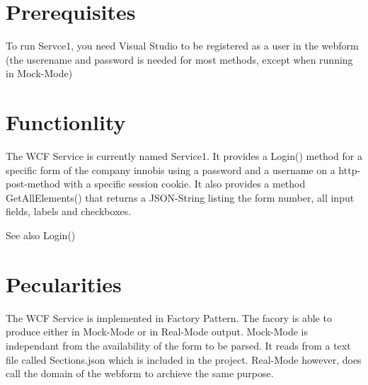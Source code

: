 \hypertarget{index_zero}{}\section{Prerequisites}\label{index_zero}
To run Servce1, you need Visual Studio to be registered as a user in the webform (the userename and password is needed for most methods, except when running in Mock-\/\+Mode)\hypertarget{index_first}{}\section{Functionlity}\label{index_first}
The W\+CF Service is currently named Service1. It provides a Login() method for a specific form of the company innobis using a password and a username on a http-\/post-\/method with a specific session cookie. It also provides a method Get\+All\+Elements() that returns a J\+S\+O\+N-\/\+String listing the form number, all input fields, labels and checkboxes. \begin{DoxySeeAlso}{See also}
Login()
\end{DoxySeeAlso}
\hypertarget{index_second}{}\section{Pecularities}\label{index_second}
The W\+CF Service is implemented in Factory Pattern. The facory is able to produce either in Mock-\/\+Mode or in Real-\/\+Mode output. Mock-\/\+Mode is independant from the availability of the form to be parsed. It reads from a text file called Sections.\+json which is included in the project. Real-\/\+Mode however, does call the domain of the webform to archieve the same purpose. 